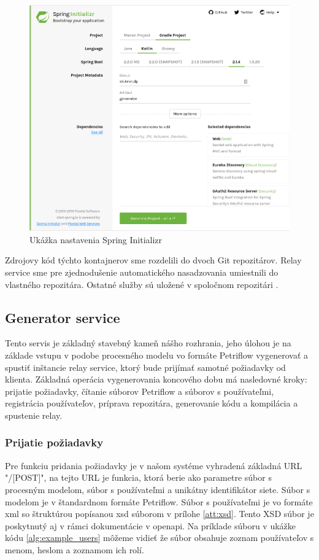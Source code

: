 \begin{figure}[!htbp]
	\centering
	\includegraphics[width=16cm]{img/initializr.png}
	\caption{Ukážka nastavenia Spring Initializr}
	\label{initializr}
\end{figure}

Zdrojovy kód týchto kontajnerov sme rozdelili do dvoch Git repozitárov. Relay service sme pre zjednodušenie automatického nasadzovania umiestnili do vlastného repozitára\cite{dp_relay}. Ostatné služby sú uložené v spoločnom repozitári \cite{dp_repo}. 



\subsection{Generator service}
Tento servis je základný stavebný kameň nášho rozhrania, jeho úlohou je na základe vstupu v podobe procesného modelu vo formáte Petriflow vygenerovať a spustiť inštancie relay service, ktorý bude prijímať samotné požiadavky od klienta. Základná operácia vygenerovania koncového dobu má nasledovné kroky:
prijatie požiadavky,
čítanie súborov Petriflow a súborov s používateľmi,
registrácia používateľov,
príprava repozitára,
generovanie kódu
a kompilácia a spustenie relay.

\subsubsection{Prijatie požiadavky}
Pre funkciu pridania požiadavky je v našom systéme vyhradená základná URL "/[POST]", na tejto URL je funkcia, ktorá berie ako parametre súbor s procesným modelom, súbor s používateľmi a unikátny identifikátor siete. Súbor s modelom je v štandardnom formáte Petriflow. Súbor s používateľmi je vo formáte \acrshort{xml} so štruktúrou popísanou \acrshort{xsd} súborom v prílohe \ref{att:xsd}. Tento XSD súbor je poskytnutý aj v rámci dokumentácie v \acrshort{openapi}. Na príklade súboru v ukážke kódu \ref{alg:example_users} môžeme vidieť že súbor obsahuje zoznam používateľov s menom, heslom a zoznamom ich rolí.

